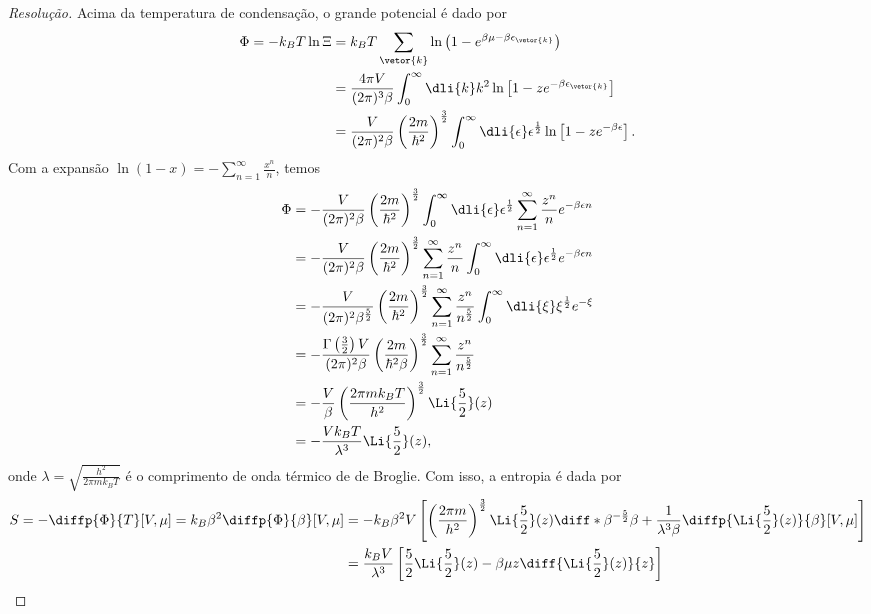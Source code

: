 \begin{proof}[Resolução]
    Acima da temperatura de condensação, o grande potencial é dado por
    \begin{align*}
        \Phi = -k_B T \ln\Xi &= k_B T \sum_{\vetor{k}} \ln\left(1 - e^{\beta \mu -\beta \epsilon_{\vetor{k}}}\right)\\
                             &= \frac{4\pi V}{(2\pi)^3\beta} \int_{0}^\infty\dli{k} k^2\ln\left[1 - z e^{-\beta \epsilon_{\vetor{k}}}\right]\\
                             &= \frac{V}{(2\pi)^2 \beta} \left(\frac{2m}{\hbar^2}\right)^{\frac32}\int_0^\infty \dli{\epsilon} \epsilon^{\frac12} \ln\left[1 - z e^{- \beta \epsilon}\right].
    \end{align*}
    Com a expansão \(\ln(1 - x) = - \sum_{n = 1}^\infty \frac{x^n}{n}\), temos
    \begin{align*}
        \Phi &= -\frac{V}{(2\pi)^2 \beta} \left(\frac{2 m}{\hbar^2}\right)^{\frac32} \int_0^\infty \dli{\epsilon} \epsilon^{\frac12} \sum_{n = 1}^\infty \frac{z^n}{n}  e^{- \beta \epsilon n}\\
             &= - \frac{V}{(2\pi)^2 \beta} \left(\frac{2m}{\hbar^2}\right)^{\frac32} \sum_{n = 1}^\infty \frac{z^n}{n} \int_0^\infty \dli{\epsilon} \epsilon^{\frac12} e^{-\beta \epsilon n}\\
             &= - \frac{V}{(2\pi)^2 \beta^{\frac52}} \left(\frac{2m}{\hbar^2}\right)^{\frac32} \sum_{n = 1}^\infty \frac{z^n}{n^{\frac52}} \int_0^\infty \dli{\xi} \xi^{\frac12} e^{-\xi}\\
             &= -\frac{\Gamma\left(\frac32\right)V}{(2\pi)^2 \beta}\left(\frac{2m}{\hbar^2 \beta}\right)^{\frac32} \sum_{n = 1}^{\infty} \frac{z^n}{n^{\frac52}}\\
             &= - \frac{V}{\beta} \left(\frac{2\pi m k_BT}{h^2}\right)^{\frac32} \Li{\frac52}(z)\\
             &= -\frac{V k_B T}{\lambda^3} \Li{\frac52}(z),
    \end{align*}
    onde \(\lambda = \sqrt{\frac{h^2}{2\pi m k_B T}}\) é o comprimento de onda térmico de de Broglie. Com isso,
    a entropia é dada por
    \begin{align*}
        S = - \diffp{\Phi}{T}[V, \mu] = k_B \beta^2 \diffp{\Phi}{\beta}[V, \mu]
        &= -k_B \beta^2V \left[\left(\frac{2\pi m}{h^2}\right)^{\frac32}\Li{\frac52}(z)\diff*{\beta^{-\frac52}}{\beta} + \frac{1}{\lambda^3 \beta}\diffp{\Li{\frac52}(z)}{\beta}[V,\mu]\right]\\
        &= \frac{k_B V}{\lambda^3}\left[\frac52 \Li{\frac52}(z) - \beta \mu z\diff{\Li{\frac52}(z)}{z}\right]\\

\end{align*}
\end{proof}
